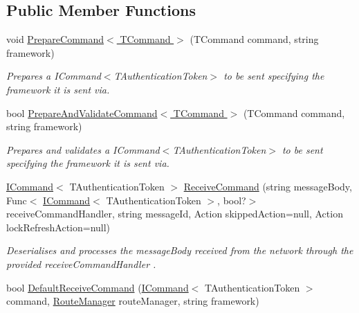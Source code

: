 \subsection*{Public Member Functions}
\begin{DoxyCompactItemize}
\item 
void \hyperlink{interfaceCqrs_1_1Azure_1_1ServiceBus_1_1IAzureBusHelper_ad25c4130a4357504cfccba49999493c7_ad25c4130a4357504cfccba49999493c7}{Prepare\+Command$<$ T\+Command $>$} (T\+Command command, string framework)
\begin{DoxyCompactList}\small\item\em Prepares a I\+Command$<$\+T\+Authentication\+Token$>$ to be sent specifying the framework it is sent via. \end{DoxyCompactList}\item 
bool \hyperlink{interfaceCqrs_1_1Azure_1_1ServiceBus_1_1IAzureBusHelper_a283ee2cf9241a5364dd5569a9f12fa10_a283ee2cf9241a5364dd5569a9f12fa10}{Prepare\+And\+Validate\+Command$<$ T\+Command $>$} (T\+Command command, string framework)
\begin{DoxyCompactList}\small\item\em Prepares and validates a I\+Command$<$\+T\+Authentication\+Token$>$ to be sent specifying the framework it is sent via. \end{DoxyCompactList}\item 
\hyperlink{interfaceCqrs_1_1Commands_1_1ICommand}{I\+Command}$<$ T\+Authentication\+Token $>$ \hyperlink{interfaceCqrs_1_1Azure_1_1ServiceBus_1_1IAzureBusHelper_a16dd52eec62dd41df564bb25467b710d_a16dd52eec62dd41df564bb25467b710d}{Receive\+Command} (string message\+Body, Func$<$ \hyperlink{interfaceCqrs_1_1Commands_1_1ICommand}{I\+Command}$<$ T\+Authentication\+Token $>$, bool?$>$ receive\+Command\+Handler, string message\+Id, Action skipped\+Action=null, Action lock\+Refresh\+Action=null)
\begin{DoxyCompactList}\small\item\em Deserialises and processes the {\itshape message\+Body}  received from the network through the provided {\itshape receive\+Command\+Handler} . \end{DoxyCompactList}\item 
bool \hyperlink{interfaceCqrs_1_1Azure_1_1ServiceBus_1_1IAzureBusHelper_a3c632e92e0e38110f9e7721fb31700d1_a3c632e92e0e38110f9e7721fb31700d1}{Default\+Receive\+Command} (\hyperlink{interfaceCqrs_1_1Commands_1_1ICommand}{I\+Command}$<$ T\+Authentication\+Token $>$ command, \hyperlink{classCqrs_1_1Bus_1_1RouteManager}{Route\+Manager} route\+Manager, string framework)

\end{DoxyCompactItemize}
